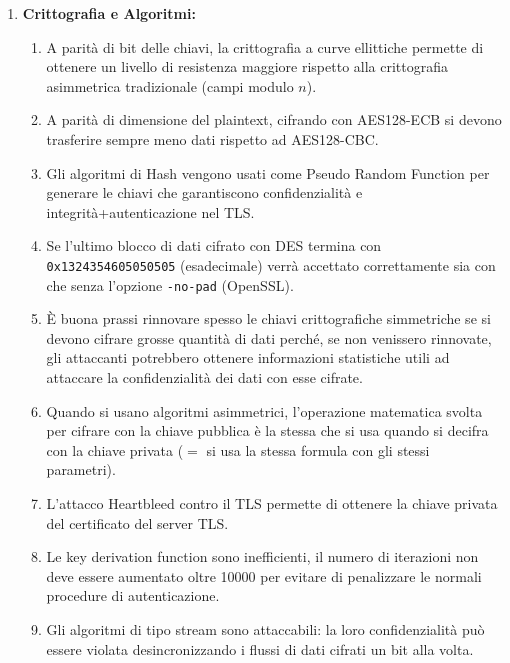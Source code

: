 \documentclass[11pt,a4paper]{article}
\begin{document}
\begin{questionbox}
\begin{enumerate}[label=\textbf{1.\arabic*}]
    \item \textbf{Crittografia e Algoritmi:}
    \begin{enumerate}[label=\alph*.]
        \item A parit\`a di bit delle chiavi, la crittografia a curve ellittiche permette di ottenere un livello di resistenza maggiore rispetto alla crittografia asimmetrica tradizionale (campi modulo $n$).
        \item A parit\`a di dimensione del plaintext, cifrando con AES128-ECB si devono trasferire sempre meno dati rispetto ad AES128-CBC.
        \item Gli algoritmi di Hash vengono usati come Pseudo Random Function per generare le chiavi che garantiscono confidenzialit\`a e integrit\`a+autenticazione nel TLS.
        \item Se l'ultimo blocco di dati cifrato con DES termina con \texttt{0x1324354605050505} (esadecimale) verr\`a accettato correttamente sia con che senza l'opzione \texttt{-no-pad} (OpenSSL).
        \item \`E buona prassi rinnovare spesso le chiavi crittografiche simmetriche se si devono cifrare grosse quantit\`a di dati perch\'e, se non venissero rinnovate, gli attaccanti potrebbero ottenere informazioni statistiche utili ad attaccare la confidenzialit\`a dei dati con esse cifrate.
        \item Quando si usano algoritmi asimmetrici, l'operazione matematica svolta per cifrare con la chiave pubblica \`e la stessa che si usa quando si decifra con la chiave privata ($=$ si usa la stessa formula con gli stessi parametri).
        \item L'attacco Heartbleed contro il TLS permette di ottenere la chiave privata del certificato del server TLS.
        \item Le key derivation function sono inefficienti, il numero di iterazioni non deve essere aumentato oltre 10000 per evitare di penalizzare le normali procedure di autenticazione.
        \item Gli algoritmi di tipo stream sono attaccabili: la loro confidenzialit\`a pu\`o essere violata desincronizzando i flussi di dati cifrati un bit alla volta.
    \end{enumerate}


\end{enumerate}
\end{questionbox}
\end{document}
